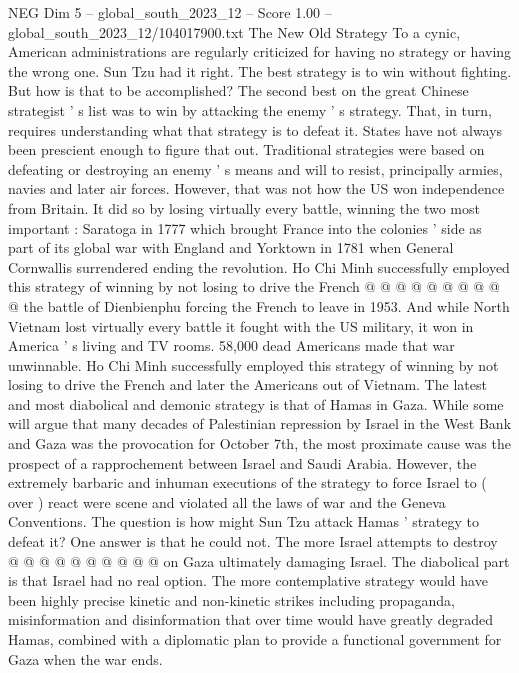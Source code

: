 \begin{textsample}{NEG Dim 5 – global\_south\_2023\_12 – Score 1.00 – global\_south\_2023\_12/104017900.txt}  \label{ex:f5_neg_240}
The New Old Strategy To a cynic, American administrations are regularly criticized for having no strategy or having the wrong one.
Sun Tzu had it right.
The best strategy is to win without fighting.
But how is that to be accomplished?
The second best on the great Chinese strategist ' s list was to win by attacking the enemy ' s strategy.
That, in turn, requires understanding what that strategy is to defeat it.
States have not always been prescient enough to figure that out.
Traditional strategies were based on defeating or destroying an enemy ' s means and will to resist, principally armies, navies and later air forces.
However, that was not how the US won independence from Britain.
It did so by losing virtually every battle, winning the two most important : Saratoga in 1777 which brought France into the colonies ' side as part of its global war with England and Yorktown in 1781 when General Cornwallis surrendered ending the revolution.
Ho Chi Minh successfully employed this strategy of winning by not losing to drive the French @ @ @ @ @ @ @ @ @ @ the battle of Dienbienphu forcing the French to leave in 1953.
And while North Vietnam lost virtually every battle it fought with the US military, it won in America ' s living and TV rooms. 58,000 dead Americans made that war unwinnable.
Ho Chi Minh successfully employed this strategy of winning by not losing to drive the French and later the Americans out of Vietnam.
The latest and most diabolical and demonic strategy is that of Hamas in Gaza.
While some will argue that many decades of Palestinian repression by Israel in the West Bank and Gaza was the provocation for October 7th, the most proximate cause was the prospect of a rapprochement between Israel and Saudi Arabia.
However, the extremely barbaric and inhuman executions of the strategy to force Israel to ( over ) react were scene and violated all the laws of war and the Geneva Conventions.
The question is how might Sun Tzu attack Hamas ' strategy to defeat it?
One answer is that he could not.
The more Israel attempts to destroy @ @ @ @ @ @ @ @ @ @ on Gaza ultimately damaging Israel.
The diabolical part is that Israel had no real option.
The more contemplative strategy would have been highly precise kinetic and non-kinetic strikes including propaganda, misinformation and disinformation that over time would have greatly degraded Hamas, combined with a diplomatic plan to provide a functional government for Gaza when the war ends.

\end{textsample}
